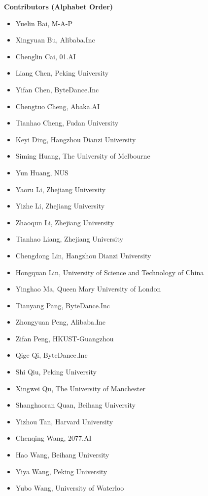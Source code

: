 \textbf{Contributors (Alphabet Order)}
\begin{multicols}{2}
    \begin{itemize}
        \item Yuelin Bai, M-A-P
        \item Xingyuan Bu, Alibaba.Inc
        \item Chenglin Cai, 01.AI
        \item Liang Chen, Peking University
        \item Yifan Chen, ByteDance.Inc
        \item Chengtuo Cheng, Abaka.AI
        \item Tianhao Cheng, Fudan University
        \item Keyi Ding, Hangzhou Dianzi University
        \item Siming Huang, The University of Melbourne
        \item Yun Huang, NUS
        \item Yaoru Li, Zhejiang University
        \item Yizhe Li, Zhejiang University
        \item Zhaoqun Li, Zhejiang University
        \item Tianhao Liang, Zhejiang University
        \item Chengdong Lin, Hangzhou Dianzi University
        \item Hongquan Lin, University of Science and Technology of China
        \item Yinghao Ma, Queen Mary University of London
        \item Tianyang Pang, ByteDance.Inc
        \item Zhongyuan Peng, Alibaba.Inc
        \item Zifan Peng, HKUST-Guangzhou
        \item Qige Qi, ByteDance.Inc
        \item Shi Qiu, Peking University
        \item Xingwei Qu, The University of Manchester
        \item Shanghaoran Quan, Beihang University
        \item Yizhou Tan, Harvard University
        \item Chenqing Wang, 2077.AI
        \item Hao Wang, Beihang University
        \item Yiya Wang, Peking University
        \item Yubo Wang, University of Waterloo

\end{itemize}
\end{multicols}
